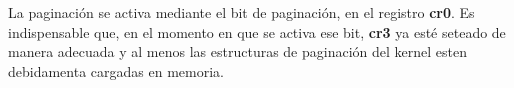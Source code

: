	La paginación se activa mediante el bit de paginación, en el
registro \textbf{cr0}. Es indispensable que, en el momento en que se
activa ese bit, \textbf{cr3} ya esté seteado de manera adecuada y al menos las
estructuras de paginación del kernel esten debidamenta cargadas en memoria.


